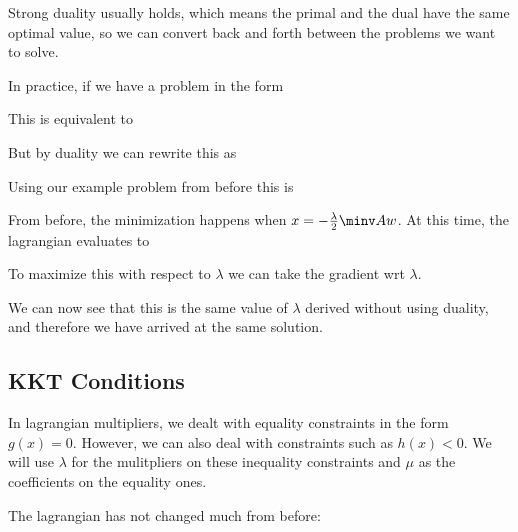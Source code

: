 \documentclass[12pt]{article}
\begin{document}

Strong duality usually holds, which means the primal and the dual have the same optimal value, so we can convert back and forth between the problems we want to solve.

In practice, if we have a problem in the form


This is equivalent to

But by duality we can rewrite this as


Using our example problem from before this is


From before, the minimization happens when $x = -\frac{\lambda}{2} \minv A w$. At this time, the lagrangian evaluates to


To maximize this with respect to $\lambda$ we can take the gradient wrt $\lambda$.


We can now see that this is the same value of $\lambda$ derived without using duality, and therefore we have arrived at the same solution.

\subsection{KKT Conditions}

In lagrangian multipliers, we dealt with equality constraints in the form $g(x) = 0$. However, we can also deal with constraints such as $h(x) < 0$. We will use $\lambda$ for the mulitpliers on these inequality constraints and $\mu$ as the coefficients on the equality ones.

The lagrangian has not changed much from before:
\end{document}
